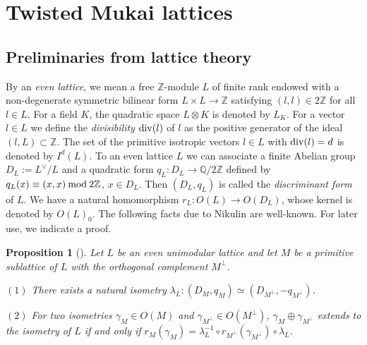 \documentclass{article}
\theoremstyle{plain}
\newtheorem{proposition}[theorem]{Proposition}%
\theoremstyle{definition}
\theoremstyle{remark}
\newcommand{\Z}{{\mathbb Z}}
\newcommand{\Q}{{\mathbb Q}}
\begin{document}
\section{Twisted Mukai lattices}\label{sec2}



\subsection{Preliminaries from lattice theory}\label{sec2.1} 






By an {\it even lattice\/}, 
we mean a free ${\Z}$-module $L$ of finite rank 
endowed with a non-degenerate symmetric bilinear form 
$L \times L \to {\Z}$ 
satisfying $(l, l) \in 2{\Z}$ 
for all $l \in L$. 
For a field $K$, 
the quadratic space $L\otimes K$ is denoted by $L_{K}$. 
For a vector $l \in L$ 
we define the {\it divisibility\/} 
${\rm div\/}(l)$ of $l$ 
as the positive generator of the ideal 
$(l, L) \subset {\Z}$. 
The set of the primitive isotropic vectors $l \in L$ 
with ${\rm div\/}(l) = d$ 
is denoted by $I^{d}(L)$. 
To an even lattice $L$ 
we can associate a finite Abelian group 
$D_{L} := L^{\vee} / L$ 
and a quadratic form 
$q_{L} : D_{L} \to {\Q}/ 2{\Z}$ 
defined by 
$q_{L} (x) \equiv (x, x) \: {\rm mod\/} \: 2{\Z}$, 
$x \in D_{L}$. 
Then 
$(D_{L}, q_{L})$ is called 
the {\it discriminant form\/} of $L$. 
We have a natural homomorphism 
$r_{L} : O(L) \to O(D_{L})$, 
whose kernel is denoted by $O(L)_{0}$. 
The following facts due to Nikulin \cite{Ni} are well-known. 
For later use, we indicate a proof. 






 

\begin{proposition}[\cite{Ni}]\label{Nikulin}
Let $L$ be an even unimodular lattice 
and let $M$ be a primitive sublattice of $L$ 
with the orthogonal complement $M^{\perp}$. 


$(1)$ 
There exists a natural isometry 
$\lambda _{L} : (D_{M}, q_{M}) \simeq (D_{M^{\perp}}, -q_{M^{\perp}})$. 



$(2)$  
For two isometries 
$\gamma _{M} \in O(M)$ 
and 
$\gamma _{M^{\perp}} \in O(M^{\perp})$, 
$\gamma _{M} \oplus \gamma _{M^{\perp}}$ 
extends to the isometry of $L$ 
if and only if 
$r_{M}(\gamma _{M}) = 
\lambda _{L}^{-1} \circ r_{M^{\perp}}(\gamma _{M^{\perp}}) \circ \lambda _{L}$. 
\end{proposition}
\end{document}
